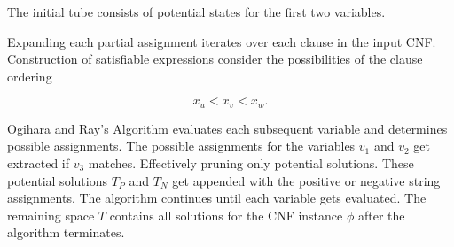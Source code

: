 
The initial tube consists of potential states for the first two variables.


Expanding each partial assignment iterates over each clause in the input CNF.  Construction of satisfiable expressions consider the possibilities of the clause ordering

\[
x_u < x_v < x_w.
\]

{\sc Ogihara and Ray's Algorithm} evaluates each subsequent variable and determines possible assignments.  The possible assignments for the variables $v_1$ and $v_2$ get extracted if $v_3$ matches.  Effectively pruning only potential solutions.  These potential solutions $T_P$ and $T_N$ get appended with the positive or negative string assignments.  The algorithm continues until each variable gets evaluated.  The remaining space $T$ contains all solutions for the CNF instance $\phi$ after the algorithm terminates.




%
%
%
%
%
%
%
%
%
		
